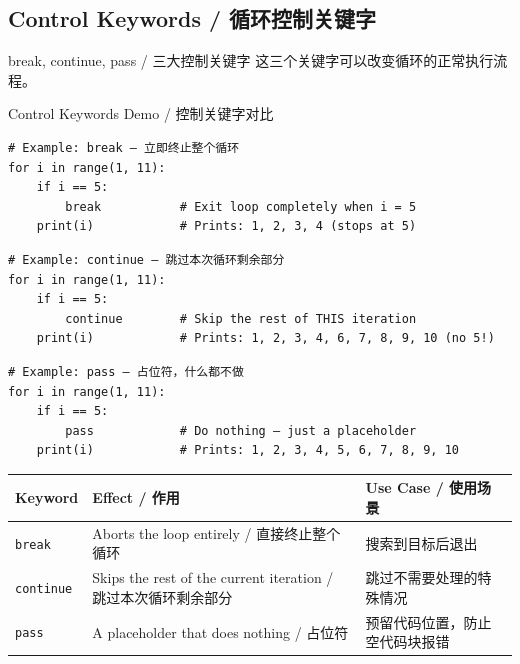 \documentclass[11pt,a4paper]{article}
\begin{document}
\subsection{Control Keywords / 循环控制关键字}

\begin{concept}{break, continue, pass / 三大控制关键字}
    这三个关键字可以改变循环的正常执行流程。
\end{concept}

\begin{examplebox}{Control Keywords Demo / 控制关键字对比}
\begin{lstlisting}
# Example: break — 立即终止整个循环
for i in range(1, 11):
    if i == 5:
        break           # Exit loop completely when i = 5
    print(i)            # Prints: 1, 2, 3, 4 (stops at 5)
\end{lstlisting}

\begin{lstlisting}
# Example: continue — 跳过本次循环剩余部分
for i in range(1, 11):
    if i == 5:
        continue        # Skip the rest of THIS iteration
    print(i)            # Prints: 1, 2, 3, 4, 6, 7, 8, 9, 10 (no 5!)
\end{lstlisting}

\begin{lstlisting}
# Example: pass — 占位符，什么都不做
for i in range(1, 11):
    if i == 5:
        pass            # Do nothing — just a placeholder
    print(i)            # Prints: 1, 2, 3, 4, 5, 6, 7, 8, 9, 10
\end{lstlisting}
\end{examplebox}

\begin{table}[h]
\centering
\renewcommand{\arraystretch}{1.5}
\begin{tabular}{@{}lll@{}}
\toprule
\textbf{Keyword} & \textbf{Effect / 作用} & \textbf{Use Case / 使用场景} \\ \midrule
\texttt{break}    & Aborts the loop entirely / 直接终止整个循环 & 搜索到目标后退出 \\
\texttt{continue} & Skips the rest of the current iteration / 跳过本次循环剩余部分 & 跳过不需要处理的特殊情况 \\
\texttt{pass}     & A placeholder that does nothing / 占位符 & 预留代码位置，防止空代码块报错 \\ \bottomrule
\end{tabular}
\end{table}

\end{document}

